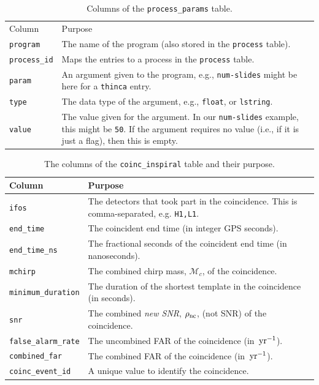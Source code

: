 \begin{table}[p]
\label{tab:process_params}
\center
\begin{tabular}{l | p{10cm}}
Column      &   Purpose     \\
\texttt{program}    &   The name of the program (also stored in the \texttt{process} table). \\
\hline
\texttt{process\_id}    &   Maps the entries to a process in the \texttt{process} table. \\
\hline
\texttt{param}      &   An argument given to the program, e.g., \texttt{num-slides} might be here for a \texttt{thinca} entry. \\
\hline
\texttt{type}   &   The data type of the argument, e.g., \texttt{float}, or \texttt{lstring}. \\
\hline
\texttt{value}  &   The value given for the argument. In our \texttt{num-slides} example, this might be \texttt{50}. If the argument requires no value (i.e., if it is just a flag), then this is empty.
\end{tabular}
\caption{Columns of the \texttt{process\_params} table.}
\end{table}

\pagebreak

\begin{table}[p]
\label{tab:coinc_inspiral}
\center
\begin{tabular}{l | p{10cm}}
Column      &   Purpose     \\
\hline \hline
\texttt{ifos}   &   The detectors that took part in the coincidence. This is comma-separated, e.g. \texttt{H1,L1}. \\
\hline
\texttt{end\_time}  &   The coincident end time (in integer GPS seconds). \\
\hline
\texttt{end\_time\_ns} &    The fractional seconds of the coincident end time (in nanoseconds). \\
\hline
\texttt{mchirp} &   The combined chirp mass, $\mathcal{M}_c$, of the coincidence. \\
\hline
\texttt{minimum\_duration}  &   The duration of the shortest template in the coincidence (in seconds). \\
\hline
\texttt{snr}    &   The combined \emph{new \ac{SNR}}, $\rho_{\mathrm{nc}}$, (not \ac{SNR}) of the coincidence. \\
\hline
\texttt{false\_alarm\_rate} & The uncombined \ac{FAR} of the coincidence (in $\,\mathrm{yr}^{-1}$). \\
\hline
\texttt{combined\_far}  & The combined \ac{FAR} of the coincidence (in $\,\mathrm{yr}^{-1}$). \\
\hline
\texttt{coinc\_event\_id}   & A unique value to identify the coincidence.
\end{tabular}
\caption{The columns of the \texttt{coinc\_inspiral} table and their purpose.}
\end{table}

